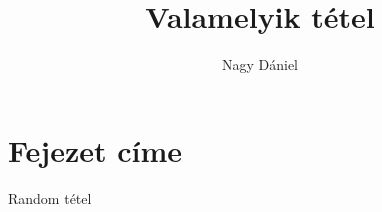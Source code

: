 \documentclass[12pt]{article}
\theoremstyle{plain}
\begin{document}
\title{Valamelyik tétel}
\author{Nagy Dániel}


\maketitle

\newpage

\section{Fejezet címe}
Random tétel
\end{document}
